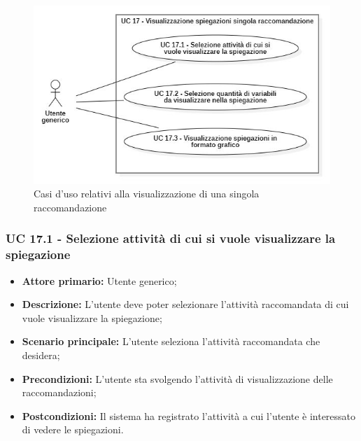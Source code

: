 \begin{figure}[H]
    \centering
    \includegraphics[scale=0.6]{immagini/usecase/cd12.JPG}
    \caption{Casi d'uso relativi alla visualizzazione di una singola raccomandazione}
\end{figure}

\subsubsection{UC 17.1 - Selezione attività di cui si vuole visualizzare la spiegazione}
\begin{itemize}
	\item \textbf{Attore primario:} Utente generico;
	\item \textbf{Descrizione:} L'utente deve poter selezionare l'attività raccomandata di cui vuole visualizzare la spiegazione;
	\item \textbf{Scenario principale:} L'utente seleziona l'attività raccomandata che desidera;

	\item \textbf{Precondizioni:} L'utente sta svolgendo l'attività di visualizzazione delle raccomandazioni;
	\item \textbf{Postcondizioni:} Il sistema ha registrato l'attività a cui l'utente è interessato di vedere le spiegazioni.
\end{itemize}

